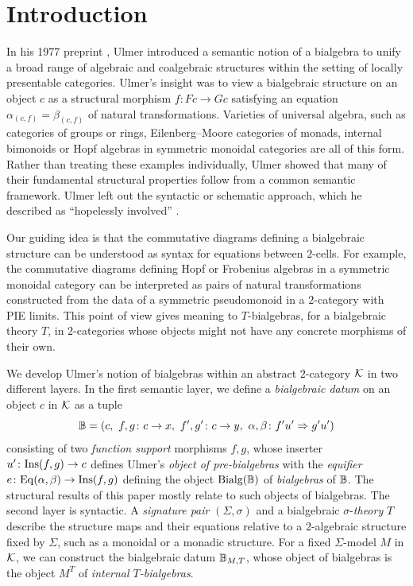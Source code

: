 
\section{Introduction}

In his 1977 preprint \cite{Ulmer1977Bialgebras}, Ulmer introduced a semantic notion of a bialgebra to unify a broad range of algebraic and coalgebraic structures within the setting of locally presentable categories. Ulmer's insight was to view a bialgebraic structure on an object $c$ as a structural morphism $f\colon Fc\to Gc$ satisfying an equation $\alpha_{(c,f)} = \beta_{(c,f)}$ of natural transformations. Varieties of universal algebra, such as categories of groups or rings, Eilenberg--Moore categories of monads, internal bimonoids or Hopf algebras in symmetric monoidal categories are all of this form. Rather than treating these examples individually, Ulmer showed that many of their fundamental structural properties follow from a common semantic framework. Ulmer left out the syntactic or schematic approach, which he described as ``hopelessly involved'' \cite[3.1]{Ulmer1977Bialgebras}.

Our guiding idea is that the commutative diagrams defining a bialgebraic structure can be understood as syntax for equations between $2$-cells. For example, the commutative diagrams defining Hopf or Frobenius algebras in a symmetric monoidal category can be interpreted as pairs of natural transformations constructed from the data of a symmetric pseudomonoid in a $2$-category with PIE limits. This point of view gives meaning to $T$-bialgebras, for a bialgebraic theory $T$, in $2$-categories whose objects might not have any concrete morphisms of their own.

We develop Ulmer's notion of bialgebras within an abstract $2$-category $\mathcal{K}$ in two different layers. In the first semantic layer, we define a \emph{bialgebraic datum} on an object $c$ in $\mathcal{K}$ as a tuple
$$
\B = (c,\ f,g\colon c\to x,\ f',g'\colon c\to y,\ \alpha,\beta\colon f'u'\Rightarrow g'u')
$$
consisting of two \emph{function support} morphisms $f,g$, whose inserter $u'\colon \mathrm{Ins}(f,g)\to c$ defines Ulmer's \textit{object of pre-bialgebras} with the \textit{equifier} $e\colon \mathrm{Eq}(\alpha,\beta)\to \mathrm{Ins}(f,g)$ defining the object $\mathrm{Bialg}(\mathbb{B})$ of \textit{bialgebras} of $\mathbb{B}$. The structural results of this paper mostly relate to such objects of bialgebras. The second layer is syntactic. A \textit{signature pair} $(\Sigma,\sigma)$ and a bialgebraic $\sigma$-\textit{theory} $T$ describe the structure maps and their equations relative to a $2$-algebraic structure fixed by $\Sigma$, such as a monoidal or a monadic structure. For a fixed $\Sigma$-model $M$ in $\mathcal{K}$, we can construct the bialgebraic datum $\mathbb{B}_{M,T}$, whose object of bialgebras is the object $M^T$ of \textit{internal $T$-bialgebras}.

